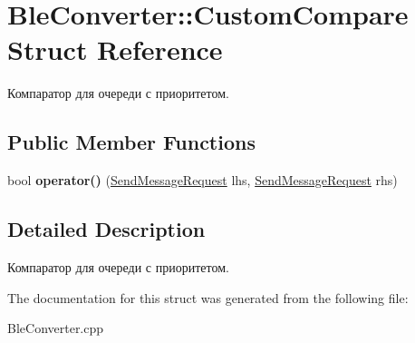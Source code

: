 \hypertarget{structBleConverter_1_1CustomCompare}{}\section{Ble\+Converter\+:\+:Custom\+Compare Struct Reference}
\label{structBleConverter_1_1CustomCompare}


Компаратор для очереди с приоритетом.  


\subsection*{Public Member Functions}
\begin{DoxyCompactItemize}
\item 
\mbox{\label{structBleConverter_1_1CustomCompare_aceaf9bbbc7e92e8467cc58c2e69573ba}} 
bool {\bfseries operator()} (\hyperlink{classSendMessageRequest}{Send\+Message\+Request} lhs, \hyperlink{classSendMessageRequest}{Send\+Message\+Request} rhs)
\end{DoxyCompactItemize}


\subsection{Detailed Description}
Компаратор для очереди с приоритетом. 

The documentation for this struct was generated from the following file\+:\begin{DoxyCompactItemize}
\item 
Ble\+Converter.\+cpp\end{DoxyCompactItemize}
